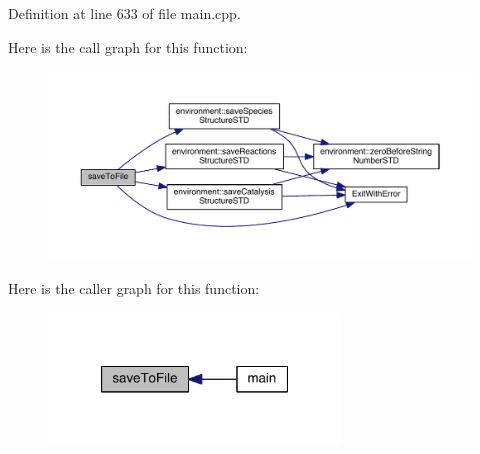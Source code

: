Definition at line 633 of file main.\-cpp.



Here is the call graph for this function\-:\nopagebreak
\begin{figure}[H]
\begin{center}
\leavevmode
\includegraphics[width=350pt]{a00089_acac21f7e718db9d00451e3caaaacc25f_cgraph}
\end{center}
\end{figure}




Here is the caller graph for this function\-:\nopagebreak
\begin{figure}[H]
\begin{center}
\leavevmode
\includegraphics[width=220pt]{a00089_acac21f7e718db9d00451e3caaaacc25f_icgraph}
\end{center}
\end{figure}


